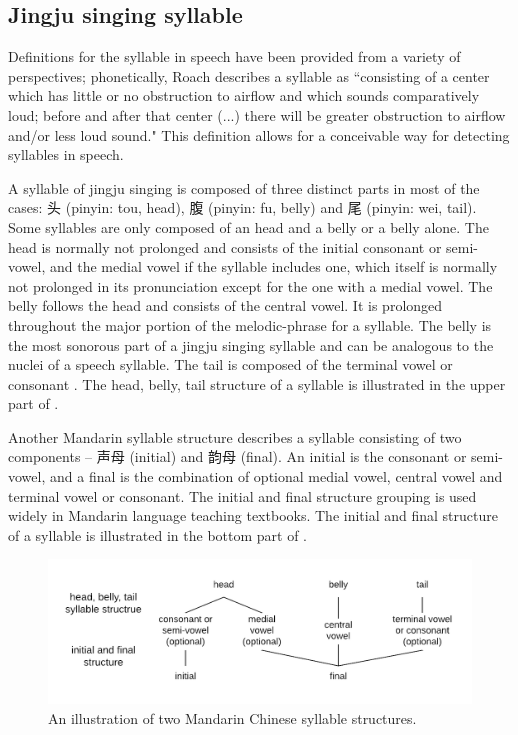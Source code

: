 \subsection{Jingju singing syllable}\label{sec:ch2:jingju_syllable}

Definitions for the syllable in speech have been provided from a variety of perspectives; phonetically, Roach \cite{roach_english_2000} describes a syllable as ``consisting of a center which has little or no obstruction to airflow and which sounds comparatively loud; before and after that center (...) there will be greater obstruction to airflow and/or less loud sound." This definition allows for a conceivable way for detecting syllables in speech.

A syllable of jingju singing is composed of three distinct parts in most of the cases: 头 (pinyin: tou, head), 腹 (pinyin: fu, belly) and 尾 (pinyin: wei, tail). Some syllables are only composed of an head and a belly or a belly alone. The head is normally not prolonged and consists of the initial consonant or semi-vowel, and the medial vowel if the syllable includes one, which itself is normally not prolonged in its pronunciation except for the one with a medial vowel. The belly follows the head and consists of the central vowel. It is prolonged throughout the major portion of the melodic-phrase for a syllable. The belly is the most sonorous part of a jingju singing syllable and can be analogous to the nuclei of a speech syllable. The tail is composed of the terminal vowel or consonant \cite{Wichmann1991a}. The head, belly, tail structure of a syllable is illustrated in the upper part of .

Another Mandarin syllable structure describes a syllable consisting of two components -- 声母 (initial) and 韵母 (final). An initial is the consonant or semi-vowel, and a final is the combination of optional medial vowel, central vowel and terminal vowel or consonant. The initial and final structure grouping is used widely in Mandarin language teaching textbooks. The initial and final structure of a syllable is illustrated in the bottom part of .

\begin{figure}[ht!]
\includegraphics[width=\textwidth]{figs/blockDiags_rong/ch2_syllable_structure.png}
\caption{An illustration of two Mandarin Chinese syllable structures.}
\label{fig:ch2_syllable_structure}
\end{figure}

